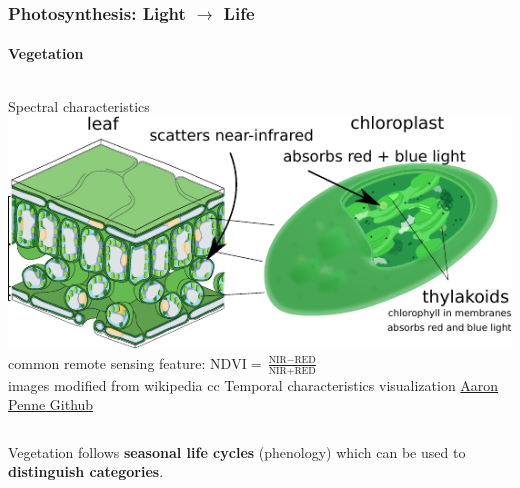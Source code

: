 \documentclass[%
  aspectratio=169,
  9pt,
  USenglish,
]{beamer}
\begin{document}
\begin{frame}
	\frametitle{Photosynthesis: Light $\rightarrow$ Life}
	\framesubtitle{Vegetation}
	
	\begin{columns}[b]
		Spectral characteristics
		\includegraphics[width=\textwidth]{images/leaf_smallannot.pdf}
		common remote sensing feature: $\text{NDVI} = \frac{\text{NIR} - \text{RED}}{\text{NIR} + \text{RED}}$ \\
		{\scriptsize images modified from wikipedia cc}
		Temporal characteristics
		{\scriptsize visualization \href{https://github.com/aaronpenne}{Aaron Penne Github}}
		
	\end{columns}
	
	\vspace{2em}
	Vegetation follows \textbf{seasonal life cycles} (phenology) which can be used to \textbf{distinguish categories}. 
	
\end{frame}
\end{document}
